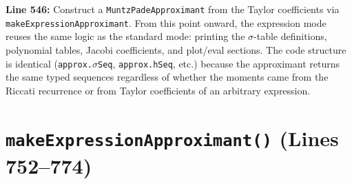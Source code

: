 \documentclass[a4paper,11pt]{article}
\begin{document}
\textbf{Line 546:} Construct a \texttt{MuntzPadeApproximant} from the Taylor
coefficients via \texttt{makeExpressionApproximant}. From this point onward,
the expression mode reuses the same logic as the standard mode: printing the
$\sigma$-table definitions, polynomial tables, Jacobi coefficients, and
plot/eval sections. The code structure is identical (\texttt{approx.$\sigma$Seq},
\texttt{approx.hSeq}, etc.) because the approximant returns the same typed
sequences regardless of whether the moments came from the Riccati recurrence
or from Taylor coefficients of an arbitrary expression.

\section{\texttt{makeExpressionApproximant()} (Lines 752--774)}
\end{document}
